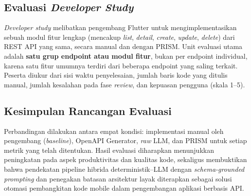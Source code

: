\subsection{Evaluasi \textit{Developer Study}}

\textit{Developer study} melibatkan pengembang Flutter untuk mengimplementasikan sebuah modul fitur lengkap (mencakup \textit{list}, \textit{detail}, \textit{create}, \textit{update}, \textit{delete}) dari REST API yang sama, secara manual dan dengan PRISM. Unit evaluasi utama adalah \textbf{satu grup endpoint atau modul fitur}, bukan per endpoint individual, karena satu fitur umumnya terdiri dari beberapa endpoint yang saling terkait. Peserta diukur dari sisi waktu penyelesaian, jumlah baris kode yang ditulis manual, jumlah kesalahan pada fase \textit{review}, dan kepuasan pengguna (skala 1--5).

\subsection{Kesimpulan Rancangan Evaluasi}

Perbandingan dilakukan antara empat kondisi: implementasi manual oleh pengembang (\textit{baseline}), OpenAPI Generator, \textit{raw} LLM, dan PRISM untuk setiap metrik yang telah ditentukan. Hasil evaluasi diharapkan menunjukkan peningkatan pada aspek produktivitas dan kualitas kode, sekaligus membuktikan bahwa pendekatan pipeline hibrida deterministik--LLM dengan \textit{schema-grounded prompting} dan penegakan batasan arsitektur layak diterapkan sebagai solusi otomasi pembangkitan kode mobile dalam pengembangan aplikasi berbasis API.
